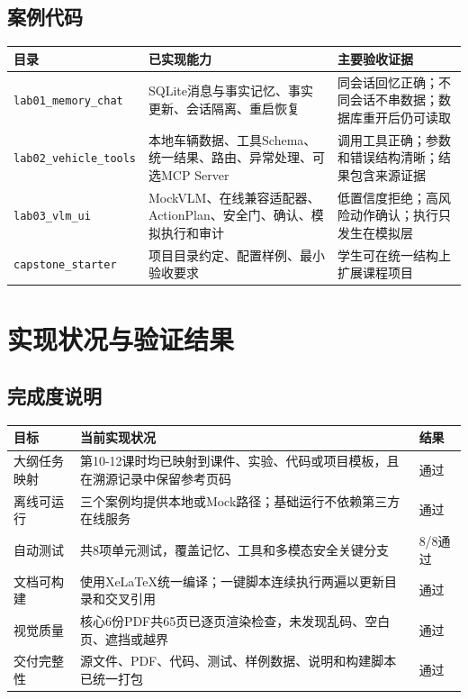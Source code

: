\documentclass[UTF8,zihao=-4]{ctexart}
\begin{document}
\subsection{案例代码}

\begin{table}[htbp]
\centering
\begin{tabularx}{\textwidth}{L{3.4cm} Y Y}
\toprule
目录 & 已实现能力 & 主要验收证据\\
\midrule
{\footnotesize\texttt{lab01\_memory\_chat}} &
SQLite消息与事实记忆、事实更新、会话隔离、重启恢复 &
同会话回忆正确；不同会话不串数据；数据库重开后仍可读取\\
{\footnotesize\texttt{lab02\_vehicle\_tools}} &
本地车辆数据、工具Schema、统一结果、路由、异常处理、可选MCP Server &
调用工具正确；参数和错误结构清晰；结果包含来源证据\\
{\footnotesize\texttt{lab03\_vlm\_ui}} &
MockVLM、在线兼容适配器、ActionPlan、安全门、确认、模拟执行和审计 &
低置信度拒绝；高风险动作确认；执行只发生在模拟层\\
{\footnotesize\texttt{capstone\_starter}} &
项目目录约定、配置样例、最小验收要求 &
学生可在统一结构上扩展课程项目\\
\bottomrule
\end{tabularx}
\end{table}

\section{实现状况与验证结果}

\subsection{完成度说明}

\begin{tabularx}{\textwidth}{L{3.5cm} Y C{2.2cm}}
\toprule
目标 & 当前实现状况 & 结果\\
\midrule
大纲任务映射 &
第10-12课时均已映射到课件、实验、代码或项目模板，且在溯源记录中保留参考页码 &
\textcolor{CourseTeal}{通过}\\
离线可运行 &
三个案例均提供本地或Mock路径；基础运行不依赖第三方在线服务 &
\textcolor{CourseTeal}{通过}\\
自动测试 &
共8项单元测试，覆盖记忆、工具和多模态安全关键分支 &
\textcolor{CourseTeal}{8/8通过}\\
文档可构建 &
使用XeLaTeX统一编译；一键脚本连续执行两遍以更新目录和交叉引用 &
\textcolor{CourseTeal}{通过}\\
视觉质量 &
核心6份PDF共65页已逐页渲染检查，未发现乱码、空白页、遮挡或越界 &
\textcolor{CourseTeal}{通过}\\
交付完整性 &
源文件、PDF、代码、测试、样例数据、说明和构建脚本已统一打包 &
\textcolor{CourseTeal}{通过}\\
\bottomrule
\end{tabularx}
\end{document}
